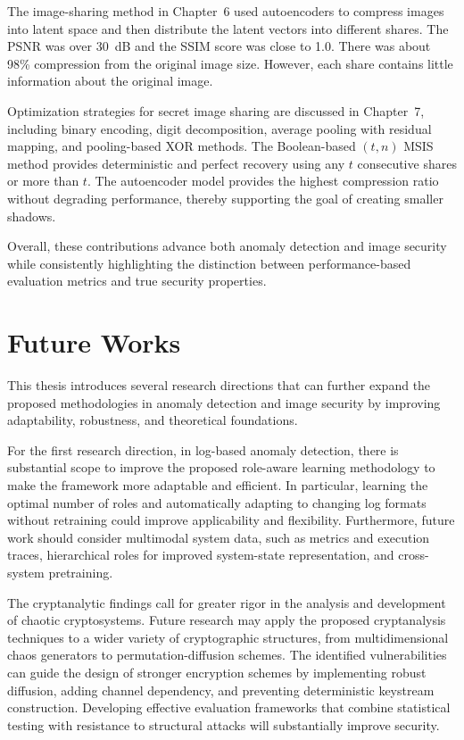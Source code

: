 The image-sharing method in Chapter~6 used autoencoders to compress images into latent space and then distribute the latent vectors into different shares. The PSNR was over 30~dB and the SSIM score was close to 1.0. There was about 98\% compression from the original image size. However, each share contains little information about the original image.

Optimization strategies for secret image sharing are discussed in Chapter~7, including binary encoding, digit decomposition, average pooling with residual mapping, and pooling-based XOR methods. The Boolean-based $(t,n)$ MSIS method provides deterministic and perfect recovery using any $t$ consecutive shares or more than $t$. The autoencoder model provides the highest compression ratio without degrading performance, thereby supporting the goal of creating smaller shadows.

Overall, these contributions advance both anomaly detection and image security while consistently highlighting the distinction between performance-based evaluation metrics and true security properties.


\section{Future Works}

This thesis introduces several research directions that can further expand the proposed methodologies in anomaly detection and image security by improving adaptability, robustness, and theoretical foundations.

For the first research direction, in log-based anomaly detection, there is substantial scope to improve the proposed role-aware learning methodology to make the framework more adaptable and efficient. In particular, learning the optimal number of roles and automatically adapting to changing log formats without retraining could improve applicability and flexibility. Furthermore, future work should consider multimodal system data, such as metrics and execution traces, hierarchical roles for improved system-state representation, and cross-system pretraining.

The cryptanalytic findings call for greater rigor in the analysis and development of chaotic cryptosystems. Future research may apply the proposed cryptanalysis techniques to a wider variety of cryptographic structures, from multidimensional chaos generators to permutation-diffusion schemes. The identified vulnerabilities can guide the design of stronger encryption schemes by implementing robust diffusion, adding channel dependency, and preventing deterministic keystream construction. Developing effective evaluation frameworks that combine statistical testing with resistance to structural attacks will substantially improve security.

